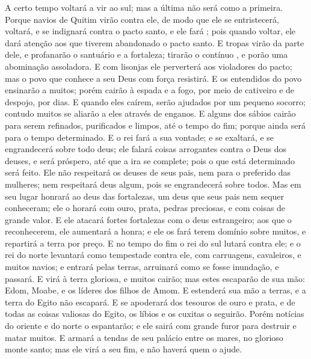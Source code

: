 {A certo tempo voltará a vir ao sul; mas a última
{} não será como a primeira.
Porque navios de Quitim virão contra ele, de modo que ele se entristecerá, voltará, e se indignará contra o pacto santo, e ele fará
{} ; pois quando voltar, ele dará atenção aos que tiverem abandonado o pacto santo.
E tropas
 virão da parte dele, e profanarão o santuário e a fortaleza; tirarão o contínuo
{} , e porão uma abominação assoladora.
E com lisonjas ele perverterá aos violadores do pacto; mas o povo que conhece a seu Deus com força resistirá.
E os entendidos do povo ensinarão a muitos; porém cairão à espada e a fogo, por meio de cativeiro e de despojo, por
{} dias.
E quando eles caírem, serão ajudados por um pequeno socorro; contudo muitos se aliarão a eles através de enganos.
E alguns dos sábios cairão para serem refinados, purificados e limpos, até o tempo do fim; porque
{} ainda será para o tempo determinado.
E o rei fará a sua vontade; e se exaltará, e se engrandecerá sobre todo deus; ele falará coisas arrogantes contra o Deus dos deuses, e será próspero, até que a ira se complete; pois o que está determinado será feito.
Ele não respeitará os deuses de seus pais, nem para o preferido das mulheres; nem respeitará deus algum, pois se engrandecerá sobre todos.
Mas em seu lugar honrará ao deus das fortalezas, um deus que seus pais nem sequer conheceram; ele o horará com ouro, prata, pedras preciosas, e com coisas de grande valor.
E ele atacará
 fortes fortalezas com o deus estrangeiro; aos que o reconhecerem, ele aumentará a honra; e ele os fará terem domínio sobre muitos, e repartirá a terra por preço.
E no tempo do fim o rei do sul lutará contra ele; e o rei do norte levantará como tempestade contra ele, com carruagens, cavaleiros, e muitos navios; e entrará pelas terras, arruinará como se fosse inundação, e passará.
E virá à terra gloriosa, e muitos
{} cairão; mas estes escaparão de sua mão: Edom, Moabe, e os líderes dos filhos de Amom.
E estenderá sua mão a
{} terras, e a terra do Egito não escapará.
E se apoderará dos tesouros de ouro e prata, e de todas as coisas valiosas do Egito, os líbios e os cuxitas
 o seguirão.
Porém notícias do oriente e do norte o espantarão; e ele sairá com grande furor para destruir e matar muitos.
E armará a tendas de seu palácio entre os mares, no glorioso monte santo; mas ele virá a seu fim, e não haverá quem o ajude.

\par }

